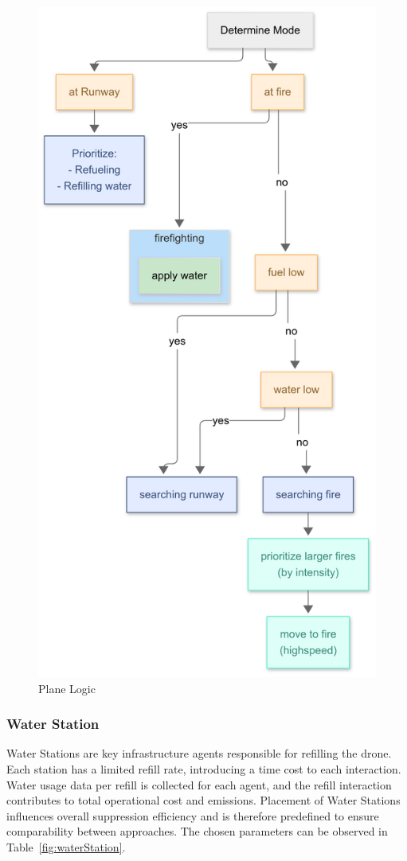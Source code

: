 \documentclass[11pt, a4paper]{article}
\begin{document}
\begin{figure}[H]
    \centering
    \includegraphics[width=0.6\linewidth]{figures/plane_logic.png}
    \caption{Plane Logic}
    \label{fig:planeLogic}
\end{figure}
\newpage

\subsubsection{Water Station}
\label{sec:WaterStation}
Water Stations are key infrastructure agents responsible for refilling the drone. Each station has a limited refill rate, introducing a time cost to each interaction. Water usage data per refill is collected for each agent, and the refill interaction contributes to total operational cost and emissions. Placement of Water Stations influences overall suppression efficiency and is therefore predefined to ensure comparability between approaches. The chosen parameters can be observed in Table~\ref{fig:waterStation}.
\end{document}
